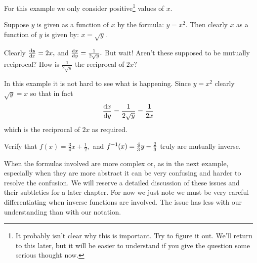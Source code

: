 \begin{myexample}
  For this example we only consider positive\footnote{It probably
    isn't clear why this is important. Try to figure it out. We'll
    return to this later, but it will be easier to understand if you
    give the question some serious thought now.} values of $x.$ 

  Suppose $y$ is given as a function of $x$ by the formula: $y=x^2.$
  Then clearly $x$ as a function of $y$ is given by: $x=\sqrt{y}.$

  Clearly $\frac{\text{d}{y}}{\text{d}{x}} = 2x,$ and $\frac{\text{d}{x}}{\text{d}{y}}=\frac{1}{2\sqrt{y}}.$
  But wait! Aren't these supposed to be mutually reciprocal? How is
  $\frac{1}{2\sqrt{y}}$ the reciprocal of $2x?$

  In this example it is not hard to see what is happening. Since
  $y=x^2$ clearly $\sqrt{y}=x$ so that in fact
$$
\frac{\text{d}{x}}{\text{d}{y}}=\frac{1}{2\sqrt{y}} = \frac{1}{2x}
$$
which is the reciprocal of $2x$ as required. 
\begin{embeddedproblem}{}
  Verify that \(f(x) = \frac34x+\frac12,\) and \(f^{-1}(x) =
  \frac43y-\frac23\) truly are mutually inverse.
\end{embeddedproblem}\end{myexample}

When the formulas involved are more complex or, as in the next
example, especially when they are more abstract it can be very
confusing and harder to resolve the confusion. We will reserve a
detailed discussion of these issues and their subtleties for a later
chapter. For now we just note we must be very careful differentiating
when inverse functions are involved. The issue has less with our
understanding than with our notation.

